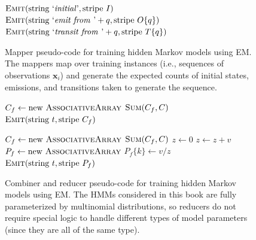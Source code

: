 \begin{figure}[t]
\begin{algorithmic}[1]
        \State $\textsc{Emit}(\textrm{string `\emph{initial}'}, \textrm{stripe }I)$
           
           \State $\textsc{Emit}(\textrm{string `\emph{emit from }'}+q, \textrm{stripe }O\{q\})$
           \State $\textsc{Emit}(\textrm{string `\emph{transit from }'}+q, \textrm{stripe }T\{q\})$
        \EndFor

    \EndProcedure
    \EndFunction
  \end{algorithmic}
  \caption{Mapper pseudo-code for training hidden Markov models using EM.  The mappers map over training instances (i.e., sequences of observations $\textbf{x}_i$) and generate the expected counts of initial states, emissions, and transitions taken to generate the sequence.}
\label{figure:chapter6:mr_hmm_mapper}
\end{figure}

\begin{figure}[t]
\algrenewcommand{}
\algrenewcommand{}
  \begin{algorithmic}[1]
        \State $C_f \gets \textrm{new }\textsc{AssociativeArray}$
        \State $\textsc{Sum}(C_f, C)$
    \EndFor
     \State $\textsc{Emit}(\textrm{string }t, \textrm{stripe }C_f)$
    \EndProcedure
    \EndFunction
  \end{algorithmic}
  \begin{algorithmic}[1]
        \State $C_f \gets \textrm{new }\textsc{AssociativeArray}$
        \State $\textsc{Sum}(C_f, C)$
    \EndFor
    \State $z \gets 0$
	\State $z \gets z + v$
    \EndFor
    \State $P_f \gets \textrm{new }\textsc{AssociativeArray}$
	\State $P_f\{k\} \gets v / z$    
    \EndFor
     \State $\textsc{Emit}(\textrm{string }t, \textrm{stripe }P_f)$
    \EndProcedure
    \EndFunction
  \end{algorithmic}
  \caption{Combiner and reducer pseudo-code for training hidden Markov models using EM. The HMMs considered in this book are fully parameterized by multinomial distributions, so reducers do not require special logic to handle different types of model parameters (since they are all of the same type).}
\label{figure:chapter6:mr_hmm_reducer}
\end{figure}

